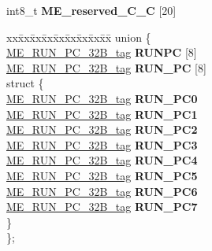 \begin{DoxyCompactItemize}
\begin{tabbing}
\end{tabbing}\item 
\mbox{\label{structME__struct__tag_a4a809e9d1bb1030495ec5df4b95b7e73}} 
int8\+\_\+t {\bfseries M\+E\+\_\+reserved\+\_\+C\+\_\+C} \mbox{[}20\mbox{]}
\item 
\mbox{\label{structME__struct__tag_a3fd8a7072160650834bfd635e03d4059}} 
\begin{tabbing}
xx\=xx\=xx\=xx\=xx\=xx\=xx\=xx\=xx\=\kill
union \{\\
\>\mbox{\hyperlink{unionME__RUN__PC__32B__tag}{ME\_RUN\_PC\_32B\_tag}} {\bfseries RUNPC} \mbox{[}8\mbox{]}\\
\>\mbox{\hyperlink{unionME__RUN__PC__32B__tag}{ME\_RUN\_PC\_32B\_tag}} {\bfseries RUN\_PC} \mbox{[}8\mbox{]}\\
\mbox{\label{unionME__struct__tag_1_1_0D1637_a63b3a5d501f8d4bea9a55de08f892392}} 
\>struct \{\\
\>\>\mbox{\hyperlink{unionME__RUN__PC__32B__tag}{ME\_RUN\_PC\_32B\_tag}} {\bfseries RUN\_PC0}\\
\>\>\mbox{\hyperlink{unionME__RUN__PC__32B__tag}{ME\_RUN\_PC\_32B\_tag}} {\bfseries RUN\_PC1}\\
\>\>\mbox{\hyperlink{unionME__RUN__PC__32B__tag}{ME\_RUN\_PC\_32B\_tag}} {\bfseries RUN\_PC2}\\
\>\>\mbox{\hyperlink{unionME__RUN__PC__32B__tag}{ME\_RUN\_PC\_32B\_tag}} {\bfseries RUN\_PC3}\\
\>\>\mbox{\hyperlink{unionME__RUN__PC__32B__tag}{ME\_RUN\_PC\_32B\_tag}} {\bfseries RUN\_PC4}\\
\>\>\mbox{\hyperlink{unionME__RUN__PC__32B__tag}{ME\_RUN\_PC\_32B\_tag}} {\bfseries RUN\_PC5}\\
\>\>\mbox{\hyperlink{unionME__RUN__PC__32B__tag}{ME\_RUN\_PC\_32B\_tag}} {\bfseries RUN\_PC6}\\
\>\>\mbox{\hyperlink{unionME__RUN__PC__32B__tag}{ME\_RUN\_PC\_32B\_tag}} {\bfseries RUN\_PC7}\\
\>\} \\
\}; \\


\end{tabbing}
\end{DoxyCompactItemize}

